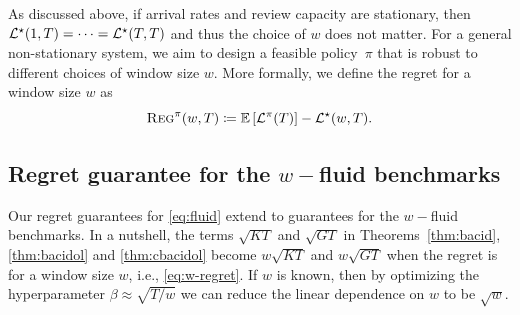 As discussed above, if arrival rates and review capacity are stationary, then $\mathcal{L}^\star(1,T) = \cdots=\mathcal{L}^\star(T,T)$ and thus the choice of $w$ does not matter. For a general non-stationary system, we aim to design a feasible policy~$\pi$ that is robust to different choices of window size $w$. More formally, we define the regret for a window size $w$ as
\begin{equation}\label{eq:w-regret}
\textsc{Reg}^\pi(w,T) \coloneqq \mathbb E\left[\mathcal{L}^\pi(T)\right] - \mathcal{L}^\star(w,T).
\end{equation}

\subsection{Regret guarantee for the $w-$fluid benchmarks}
Our regret guarantees for \eqref{eq:fluid} extend to guarantees for the $w-$fluid benchmarks. In a nutshell, the terms $\sqrt{KT}$ and $\sqrt{GT}$ in Theorems~\ref{thm:bacid}, \ref{thm:bacidol} and \ref{thm:cbacidol} become $w\sqrt{KT}$ and $w\sqrt{GT}$ when the regret is for a window size $w$, i.e., \eqref{eq:w-regret}. If $w$ is known, then by optimizing the hyperparameter $\beta \approx \sqrt{T / w}$ we can reduce the linear dependence on $w$ to be $\sqrt{w}$.

